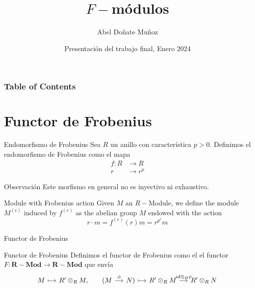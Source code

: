 \documentclass{beamer}
\title[F-módulos] %
{$F-$módulos}
\author[Abel Doñate] %
{Abel Doñate Muñoz}
\institute[UPC] %
{
  Universitat Politècica de Catalunya
}
\date[Enero 2024] %
{Presentación del trabajo final, Enero 2024}
\newcommand{\catname}[1]{{\mathbf{#1}}}
\newcommand{\Mod}{\catname{R-Mod}}
\begin{document}
\frame{\titlepage}


\begin{frame}
\frametitle{Table of Contents}
\tableofcontents
\end{frame}


\section{Functor de Frobenius}

\begin{frame}{}
\begin{block}{Endomorfismo de Frobenius}
Sea $R$ un anillo con característica $p>0$. Definimos el endomorfismo de Frobenius como el mapa
\begin{align*}
f: R &\to R \\
r &\to r^p
\end{align*}
\end{block}    

\begin{block}{Observación}
    Este morfismo en general no es inyectivo ni exhaustivo.
\end{block}
\end{frame}

\begin{frame}{}
\begin{block}{Module with Frobenius action} Given $M$ an  $R-$Module, we define the module  $M^{(e)}$ induced by  $f^{(e)}$ as the abelian group $M$ endowed with the action
  \[
  r \cdot  m  = f ^{(e)}(r)m = r ^{p^e} m
  \] 
\end{block}
\end{frame}

\begin{frame}[fragile]{Functor de Frobenius}
\begin{block}{Functor de Frobenius}
  Definimos el functor de Frobenius como el el functor $F:\Mod \to \Mod$ que envía
  \[\begin{tikzcd}[column sep=small]
	M & {R'\otimes_RM,} & {(M} & {N)} & {R'\otimes_R M} & {R'\otimes_RN}
	\arrow["\phi", from=1-3, to=1-4]
	\arrow["{id\otimes_R\phi}", from=1-5, to=1-6]
	\arrow[maps to, from=1-4, to=1-5]
	\arrow[maps to, from=1-1, to=1-2]
\end{tikzcd}\]
\end{block}
\end{frame}
\end{document}
